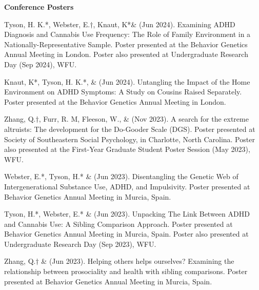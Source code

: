 {\large {\bf Conference Posters}}
\begin{etaremune}

\item Tyson, H. K.*, Webster, E.$\dagger$, Knaut, K*\& \meb (Jun 2024). Examining ADHD Diagnosis and Cannabis Use Frequency: The Role of Family Environment in a Nationally-Representative Sample. Poster presented at the Behavior Genetics Annual Meeting in London. Poster also presented at Undergraduate Research Day (Sep 2024), WFU.

\item Knaut, K*, Tyson, H. K.*, \& \meb (Jun 2024). Untangling the Impact of the Home Environment on ADHD Symptoms: A Study on Cousins Raised Separately. Poster presented at the Behavior Genetics Annual Meeting in London.

\item Zhang, Q.$\dagger$, Furr, R. M, Fleeson, W., \& \meb (Nov 2023). A search for the extreme altruists: The development for the Do-Gooder Scale (DGS). Poster presented at Society of Southeastern Social Psychology, in Charlotte, North Carolina. Poster also presented at the First-Year Graduate Student Poster Session (May 2023), WFU. %


\item Webster, E.*, Tyson, H.* \& \meb (Jun 2023). Disentangling the Genetic Web of Intergenerational Substance Use, ADHD, and Impulsivity. Poster presented at Behavior Genetics Annual Meeting in Murcia, Spain.

\item Tyson, H.*, Webster, E.*  \& \meb (Jun 2023). Unpacking The Link Between ADHD and Cannabis Use: A Sibling Comparison Approach. Poster presented at Behavior Genetics Annual Meeting in Murcia, Spain. Poster also presented at Undergraduate Research Day (Sep 2023), WFU.

\item Zhang, Q.$\dagger$ \& \meb (Jun 2023). Helping others helps ourselves? Examining the relationship between prosociality and health with sibling comparisons. Poster presented at Behavior Genetics Annual Meeting in Murcia, Spain.


\end{etaremune}

